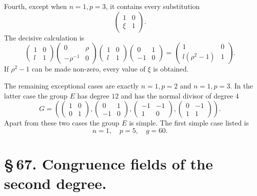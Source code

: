 \documentclass[11pt]{article}
\begin{document}
Fourth, except when $n=1,p=3$, it contains every substitution
\begin{equation}
 \begin{pmatrix}1&0\\ \xi&1\end{pmatrix}. \tag{10}
\end{equation}
The decisive calculation is
\begin{equation}
 \begin{pmatrix}1&0\\ l&1\end{pmatrix}
 \begin{pmatrix}0&\rho\\-\rho^{-1}&0\end{pmatrix}
 \begin{pmatrix}1&0\\ l&1\end{pmatrix}
 \begin{pmatrix}0&1\\-1&0\end{pmatrix}
 =
 \begin{pmatrix}1&0\\ l(\rho^2-1)&1\end{pmatrix}. \tag{11}
\end{equation}
If $\rho^2-1$ can be made non-zero, every value of $\xi$ is obtained.

The remaining exceptional cases are exactly $n=1,p=2$ and $n=1,p=3$. In the latter case the group $E$ has degree $12$ and has the normal divisor of degree $4$
\[
 G=\left(
 \begin{pmatrix}1&0\\0&1\end{pmatrix},
 \begin{pmatrix}0&1\\-1&0\end{pmatrix},
 \begin{pmatrix}-1&-1\\1&0\end{pmatrix},
 \begin{pmatrix}0&-1\\1&1\end{pmatrix}
 \right).
\]
Apart from these two cases the group $E$ is simple. The first simple case listed is
\[
 n=1,\quad p=5,\quad g=60.
\]




\section*{\S\,67. Congruence fields of the second degree.}
\end{document}
